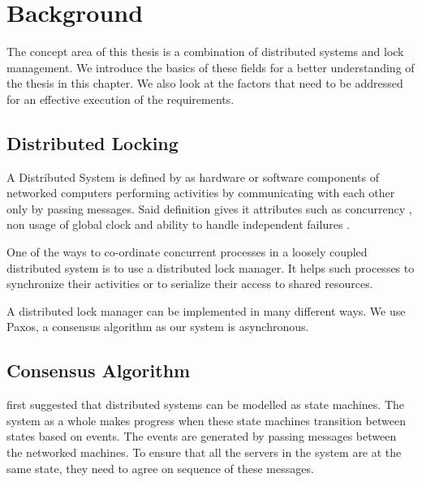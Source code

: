 \chapter{Background}
\label{chapter:background}

The concept area of this thesis is a combination of distributed systems and lock
management. We introduce the basics of these fields for a better
understanding of the thesis in this chapter. We also look at the factors that
need to be addressed for an effective execution of the requirements.

\section{Distributed Locking}

A Distributed System is defined by \citet[]{coulouris2005distributed} as 
hardware or software components of networked computers performing activities by
communicating with each other only by passing messages. Said definition gives
it attributes such as concurrency%
, non usage of global clock%
and ability to handle independent failures
.

One of the ways to co-ordinate concurrent processes in a loosely coupled 
distributed system is to use a distributed lock manager. It helps such
processes to synchronize their activities or to serialize their access to
shared resources.

A distributed lock manager can be implemented in many different ways. We use
Paxos, a consensus algorithm as our system is asynchronous.

\section{Consensus Algorithm}

\citet{Lamclocks} first suggested that distributed systems can be modelled as
state machines. The system as a whole makes progress when these state machines
transition between states based on events. The events are  generated by passing
messages between the networked machines. To ensure that all the servers in the
system are at the same state, they need to agree on sequence of these messages.


